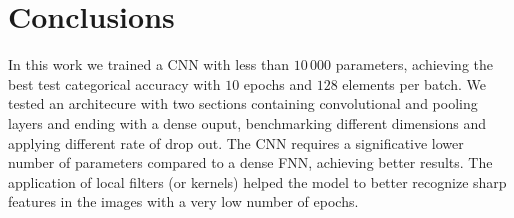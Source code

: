 \documentclass[compsoc]{IEEEtran}
\begin{document}
\section{Conclusions}
In this work we trained a CNN with less than $10\,000$ parameters, achieving the best test categorical accuracy with $10$ epochs and $128$ elements per batch. We tested an architecure with two sections containing convolutional and pooling layers and ending with a dense ouput, benchmarking different dimensions and applying different rate of drop out. The CNN requires a significative lower number of parameters compared to a dense FNN, achieving better results. The application of local filters (or kernels) helped the model to better recognize sharp features in the images with a very low number of epochs.
\end{document}
